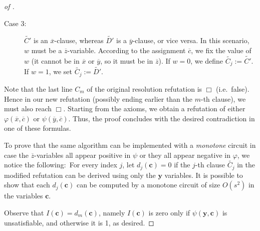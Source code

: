 \begin{proof}[of ]
\begin{description}
\item[Case 3:]
\(\widetilde{C'}\) is an \(\overline{x}\)-clause, whereas \(\widetilde{D'}\) is a \(\overline{y}\)-clause, or vice versa. In this scenario, \(w\) must be a \(\overline{z}\)-variable. According to the assignment \(\overline{c}\), we fix the value of \(w\) (it cannot be in \(\overline{x}\) or \(\overline{y}\), so it must be in \(\overline{z}\)). If \(w = 0\), we  define \(\widetilde{C_j} := \widetilde{C'}\). 
If \(w = 1\), we set \(\widetilde{C_j} := \widetilde{D'}\).


% 

\end{description}

\noindent




\medskip
Note that the last line \(C_m\) of the original resolution refutation is \(\Box\) (i.e.\ false). Hence in our new refutation (possibly ending earlier than the \(m\)-th clause), we must also reach \(\Box\). Starting from the axioms, we obtain a refutation of either \(\varphi(\overline{x},\overline{c})\) or \(\psi(\overline{y},\overline{c})\). 
Thus, the proof concludes with the desired contradiction in one of these formulas. 


\bigskip 

To prove that the same algorithm can be implemented with a \emph{monotone} circuit in case the $\overline z$-variables all appear positive in $\psi$ or they all appear negative in $\varphi$, we notice the following:\ For every index \(j\), let \(d_j(\mathbf{c}) = 0\) if the \(j\)-th clause \(\widetilde{C_j}\) in the modified refutation can be derived using only the \(\mathbf{y}\) variables. It is possible to show that 
 each \(d_j(\mathbf{c})\) can be computed by a monotone circuit of size \(O(s^2)\) in the variables \(\mathbf{c}\).

Observe that \(I(\mathbf{c}) = d_m(\mathbf{c})\), namely $I(\mathbf c)$ is zero only if  $\psi(\mathbf y,\mathbf c)$ is unsatisfiable, and otherwise it is 1, as desired. 
\end{proof}


